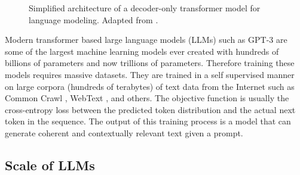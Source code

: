 \begin{figure}
    \caption{Simplified architecture of a decoder-only transformer model for language modeling. Adapted from \cite{vaswaniAttentionAllYou2017}.}
    \label{fig:transformer_architecture}
\end{figure}

Modern transformer based large language models (LLMs) such as GPT-3 \cite{brownLanguageModelsAre2020} are some of the largest machine learning models ever created with hundreds of billions of parameters and now trillions of parameters. Therefore training these models requires massive datasets. They are trained in a self supervised manner on large corpora (hundreds of terabytes) of text data from the Internet such as Common Crawl \cite{CommonCrawl2025}, WebText \cite{Gokaslan2019OpenWeb}, and others. The objective function is usually the cross-entropy loss between the predicted token distribution and the actual next token in the sequence. The output of this training process is a model that can generate coherent and contextually relevant text given a prompt.

\subsection{Scale of LLMs}

